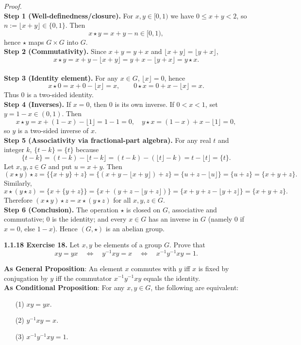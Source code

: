 \documentclass[12pt]{article}
\theoremstyle{definition}
\begin{document}
\emph{Proof.}\\
\textbf{Step 1 (Well-definedness/closure).} For $x,y\in[0,1)$ we have $0\le x+y<2$, so $n:=\lfloor x+y\rfloor\in\{0,1\}$. Then
\[
x\star y=x+y-n\in[0,1),
\]
hence $\star$ maps $G\times G$ into $G$.\\
\textbf{Step 2 (Commutativity).} Since $x+y=y+x$ and $\lfloor x+y\rfloor=\lfloor y+x\rfloor$,
\[
x\star y=x+y-\lfloor x+y\rfloor
           =y+x-\lfloor y+x\rfloor
           =y\star x.
\]\\
\textbf{Step 3 (Identity element).} For any $x\in G$, $\lfloor x\rfloor=0$, hence
\[
x\star 0=x+0-\lfloor x\rfloor=x,\qquad
0\star x=0+x-\lfloor x\rfloor=x.
\]
Thus $0$ is a two-sided identity.\\
\textbf{Step 4 (Inverses).} If $x=0$, then $0$ is its own inverse. If $0<x<1$, set $y=1-x\in(0,1)$. Then
\[
x\star y=x+(1-x)-\lfloor 1\rfloor=1-1=0,
\quad
y\star x=(1-x)+x-\lfloor 1\rfloor=0,
\]
so $y$ is a two-sided inverse of $x$.\\
\textbf{Step 5 (Associativity via fractional-part algebra).} For any real $t$ and integer $k$, $\{t-k\}=\{t\}$ because
\[
\{t-k\}=(t-k)-\lfloor t-k\rfloor=(t-k)-(\lfloor t\rfloor-k)=t-\lfloor t\rfloor=\{t\}.
\]
Let $x,y,z\in G$ and put $u=x+y$. Then
\[
(x\star y)\star z
=\{\{x+y\}+z\}
=\{(x+y-\lfloor x+y\rfloor)+z\}
=\{u+z-\lfloor u\rfloor\}
=\{u+z\}
=\{x+y+z\}.
\]
Similarly,
\[
x\star (y\star z)
=\{x+\{y+z\}\}
=\{x+(y+z-\lfloor y+z\rfloor)\}
=\{x+y+z-\lfloor y+z\rfloor\}
=\{x+y+z\}.
\]
Therefore $(x\star y)\star z=x\star(y\star z)$ for all $x,y,z\in G$.\\
\textbf{Step 6 (Conclusion).} The operation $\star$ is closed on $G$, associative and commutative; $0$ is the identity; and every $x\in G$ has an inverse in $G$ (namely $0$ if $x=0$, else $1-x$). Hence $(G,\star)$ is an abelian group.

\newpage

\noindent \textbf{1.1.18 Exercise 18.} Let $x,y$ be elements of a group $G$. Prove that
\[
xy=yx \quad \Longleftrightarrow \quad y^{-1}xy=x \quad \Longleftrightarrow \quad x^{-1}y^{-1}xy=1.
\] %

\noindent\textbf{As General Proposition}: An element $x$ commutes with $y$ iff $x$ is fixed by conjugation by $y$ iff the commutator $x^{-1}y^{-1}xy$ equals the identity.\\

\noindent \textbf{As Conditional Proposition}: For any $x,y\in G$, the following are equivalent:
\begin{enumerate}\itemsep2pt
\item[(1)] $xy=yx$.
\item[(2)] $y^{-1}xy=x$.
\item[(3)] $x^{-1}y^{-1}xy=1$.
\end{enumerate}
\end{document}
